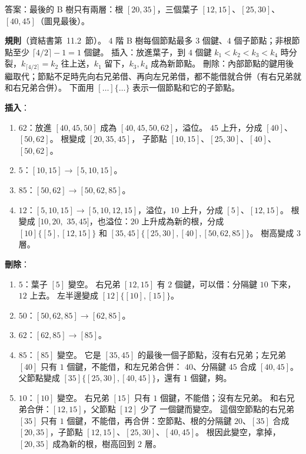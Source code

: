 \begin{pastsoln}
答案：最後的 B 樹只有兩層：根 $[20, 35]$，三個葉子 $[12, 15]$、$[25, 30]$、$[40, 45]$（圖見最後）。

\textbf{規則}（資結書第~11.2~節）。 $4$ 階 B 樹每個節點最多 $3$ 個鍵、$4$ 個子節點；非根節點至少 $\lceil 4/2 \rceil - 1 = 1$ 個鍵。
插入：放進葉子，到 $4$ 個鍵 $k_1 < k_2 < k_3 < k_4$ 時分裂，$k_{\lceil 4/2 \rceil} = k_2$ 往上送，$k_1$ 留下，$k_3, k_4$ 成為新節點。
刪除：內部節點的鍵用後繼取代；節點不足時先向右兄弟借、再向左兄弟借，都不能借就合併（有右兄弟就和右兄弟合併）。 下面用
$[\ldots]\{\ldots\}$ 表示一個節點和它的子節點。

\textbf{插入}：
\begin{enumerate}
\item \textbf{$62$}：放進 $[40, 45, 50]$ 成為 $[40, 45, 50, 62]$，溢位。 $45$ 上升，分成 $[40]$、$[50, 62]$。 根變成 $[20, 35, 45]$，
子節點 $[10, 15]$、$[25, 30]$、$[40]$、$[50, 62]$。
\item \textbf{$5$}：$[10, 15] \to [5, 10, 15]$。
\item \textbf{$85$}：$[50, 62] \to [50, 62, 85]$。
\item \textbf{$12$}：$[5, 10, 15] \to [5, 10, 12, 15]$，溢位，$10$ 上升，分成 $[5]$、$[12, 15]$。 根變成 $[10, 20,$ $35, 45]$，也溢位：$20$
上升成為新的根，分成 $[10]\{[5], \allowbreak [12, 15]\}$ 和 $[35, 45]\{[25, 30], \allowbreak [40], \allowbreak [50, 62, 85]\}$。 樹高變成 $3$ 層。
\end{enumerate}

\textbf{刪除}：
\begin{enumerate}
\item \textbf{$5$}：葉子 $[5]$ 變空。 右兄弟 $[12, 15]$ 有 $2$ 個鍵，可以借：分隔鍵 $10$ 下來，$12$ 上去。 左半邊變成
$[12]\{[10], \allowbreak [15]\}$。
\item \textbf{$50$}：$[50, 62, 85] \to [62, 85]$。
\item \textbf{$62$}：$[62, 85] \to [85]$。
\item \textbf{$85$}：$[85]$ 變空。 它是 $[35, 45]$ 的最後一個子節點，沒有右兄弟；左兄弟 $[40]$ 只有 $1$ 個鍵，不能借，和左兄弟合併：
$40$、分隔鍵 $45$ 合成 $[40, 45]$。 父節點變成 $[35]\{[25, 30], \allowbreak [40, 45]\}$，還有 $1$ 個鍵，夠。
\item \textbf{$10$}：$[10]$ 變空。 右兄弟 $[15]$ 只有 $1$ 個鍵，不能借；沒有左兄弟。 和右兄弟合併：$[12, 15]$，父節點 $[12]$ 少了
一個鍵而變空。 這個空節點的右兄弟 $[35]$ 只有 $1$ 個鍵，不能借，再合併：空節點、根的分隔鍵 $20$、$[35]$ 合成 $[20, 35]$，子節點
$[12, 15]$、$[25, 30]$、$[40, 45]$。 根因此變空，拿掉，$[20, 35]$ 成為新的根，樹高回到 $2$ 層。
\end{enumerate}


\end{pastsoln}
